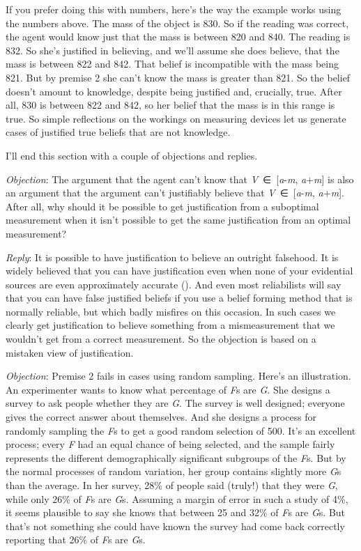 \documentclass[
  11pt,
  letterpaper,
  DIV=11,
  numbers=noendperiod,
  twoside]{scrartcl}
\begin{document}
If you prefer doing this with numbers, here's the way the example works
using the numbers above. The mass of the object is 830. So if the
reading was correct, the agent would know just that the mass is between
820 and 840. The reading is 832. So she's justified in believing, and
we'll assume she does believe, that the mass is between 822 and 842.
That belief is incompatible with the mass being 821. But by premise 2
she can't know the mass is greater than 821. So the belief doesn't
amount to knowledge, despite being justified and, crucially, true. After
all, 830 is between 822 and 842, so her belief that the mass is in this
range is true. So simple reflections on the workings on measuring
devices let us generate cases of justified true beliefs that are not
knowledge.

I'll end this section with a couple of objections and replies.

\emph{Objection}: The argument that the agent can't know that
\emph{V}~∈~{[}\emph{a}-\emph{m}, \emph{a}+\emph{m}{]} is also an
argument that the argument can't justifiably believe that
\emph{V}~∈~{[}\emph{a}-\emph{m}, \emph{a}+\emph{m}{]}. After all, why
should it be possible to get justification from a suboptimal measurement
when it isn't possible to get the same justification from an optimal
measurement?

\emph{Reply}: It is possible to have justification to believe an
outright falsehood. It is widely believed that you can have
justification even when none of your evidential sources are even
approximately accurate (). And even
most reliabilists will say that you can have false justified beliefs if
you use a belief forming method that is normally reliable, but which
badly misfires on this occasion. In such cases we clearly get
justification to believe something from a mismeasurement that we
wouldn't get from a correct measurement. So the objection is based on a
mistaken view of justification.

\emph{Objection}: Premise 2 fails in cases using random sampling. Here's
an illustration. An experimenter wants to know what percentage of
\emph{F}s are \emph{G}. She designs a survey to ask people whether they
are \emph{G}. The survey is well designed; everyone gives the correct
answer about themselves. And she designs a process for randomly sampling
the \emph{F}s to get a good random selection of 500. It's an excellent
process; every \emph{F} had an equal chance of being selected, and the
sample fairly represents the different demographically significant
subgroups of the \emph{F}s. But by the normal processes of random
variation, her group contains slightly more \emph{G}s than the average.
In her survey, 28\% of people said (truly!) that they were \emph{G},
while only 26\% of \emph{F}s are \emph{G}s. Assuming a margin of error
in such a study of 4\%, it seems plausible to say she knows that between
25 and 32\% of \emph{F}s are \emph{G}s. But that's not something she
could have known the survey had come back correctly reporting that 26\%
of \emph{F}s are \emph{G}s.
\end{document}
